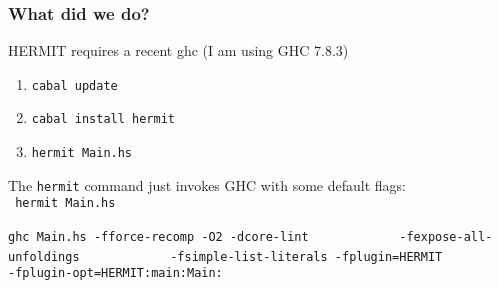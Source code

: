\begin{frame}
\frametitle{What did we do?}

HERMIT requires a recent ghc (I am using GHC 7.8.3)

\vspace{2em}

\begin{enumerate}
\item \verb|cabal update|
\item \verb|cabal install hermit|
\item \verb|hermit Main.hs|
\end{enumerate}

\vspace{2em}

The \alert{\verb|hermit|} command just invokes GHC with some default flags:\\[1ex]

{\color{hermit:syntax}{\tt\%}}\verb| hermit Main.hs|

\verb|ghc Main.hs -fforce-recomp -O2 -dcore-lint|
\verb|            -fexpose-all-unfoldings|
\verb|            -fsimple-list-literals -fplugin=HERMIT|
\verb|            -fplugin-opt=HERMIT:main:Main:|
\end{frame}
